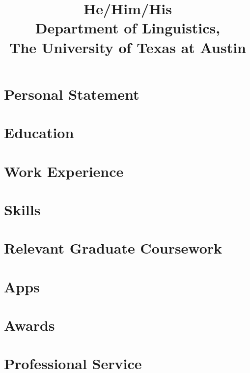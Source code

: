 \documentclass[letterpaper]{practical-cv}
\title{He/Him/His\\Department of Linguistics,\\The University of Texas at Austin}
\begin{document}
\makecvtitle

\section{Personal Statement}


\section{Education}


\section{Work Experience}


\printbibliography[title=Select Publications, keyword=resume]

\section{Skills}


\section{Relevant Graduate Coursework}


\section{Apps}


\section{Awards}


\section{Professional Service}

\end{document}
